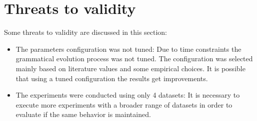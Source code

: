 \documentclass[journal]{IEEEtran}
\begin{document}
\section{Threats to validity} \label{sec:threats}

Some threats to validity are discussed in this section:
\begin{itemize}
	\item The parameters configuration was not tuned: Due to time constraints the grammatical evolution process was not tuned. The configuration was selected mainly based on literature values and some empirical choices. It is possible that using a tuned configuration the results get improvements.
	\item The experiments were conducted using only 4 datasets: It is necessary to execute more experiments with a broader range of datasets in order to evaluate if the same behavior is maintained.
\end{itemize}




\end{document}
